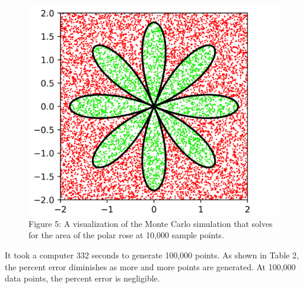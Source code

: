 \documentclass[11pt]{article}
\begin{document}
\begin{figure}[h]
\includegraphics[scale=.2]{monte_carlo_rose}
\centering\\
\footnotesize\centering Figure 5: A visualization of the Monte Carlo simulation that solves for the area of the polar rose at 10,000 sample points.
\end{figure}

It took a computer 332 seconds to generate 100,000 points. As shown in Table 2, the percent error diminishes as more and more points are generated. At 100,000 data points, the percent error is negligible.
\end{document}
